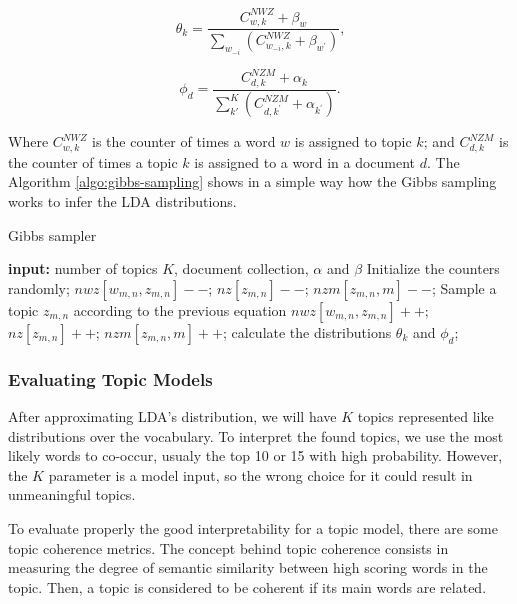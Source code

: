 	\begin{equation}
		\label{eq:theta-dist}
		\theta_{k} = \frac{C_{w,k}^{NWZ} + \beta_{w}} {\sum_{w_{-i}} \left(C_{w_{-i},k}^{NWZ} + \beta_{w^{'}} \right)} \text{,}
	\end{equation}
	
	\begin{equation}
		\label{eq:phi-dist}
		\phi_{d} = \frac{C_{d,k}^{NZM} + \alpha_{k}} {\sum_{k'}^{K} \left(C_{d,k^{'}}^{NZM} + \alpha_{k^{'}} \right)} \text{.}
	\end{equation}

	Where $C_{w,k}^{NWZ}$ is the counter of times a word $w$ is assigned to topic $k$; and $C_{d,k}^{NZM}$ is the counter of times a topic $k$ is assigned to a word in a document $d$. The Algorithm \ref{algo:gibbs-sampling} shows in a simple way how the Gibbs sampling works to infer the LDA distributions.
	
	\begin{algorithm}[h!]
		\caption{Gibbs sampler} 
		\label{algo:gibbs-sampling}
		\begin{algorithmic}[1]
			\State \textbf{input:} number of topics $K$, document collection, $\alpha$ and $\beta$
			\Begin
			\State Initialize the counters randomly;
			\State $nwz[w_{m,n}, z_{m,n}]--$; $nz[z_{m,n}]--$; $nzm[z_{m,n},m]--$;
			\State Sample a topic $z_{m,n}$ according to the previous equation
			\State $nwz[w_{m,n}, z_{m,n}]++$; $nz[z_{m,n}]++$; $nzm[z_{m,n},m]++$;
			\EndFor
			\EndFor
			\State calculate the distributions $\theta_{k}$ and $\phi_{d}$;
			\EndIf
			\EndWhile
			\End
		\end{algorithmic} 
	\end{algorithm}
	
	\subsubsection{Evaluating Topic Models}
	
	After approximating LDA's distribution, we will have $K$ topics represented like distributions over the vocabulary. To interpret the found topics, we use the most likely words  to co-occur, usualy the top 10 or 15 with high probability. However, the $K$ parameter is a model input, so the wrong choice for it could result in unmeaningful topics. 
	
	To evaluate properly the good interpretability for a topic model, there are some topic coherence metrics. The concept behind topic coherence consists in measuring the degree of semantic similarity between high scoring words in the topic. Then, a topic is considered to be coherent if its main words are related.
	
